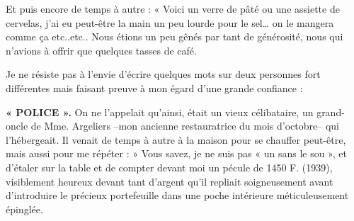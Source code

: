Et puis encore de temps à autre : « Voici un verre de pâté ou une assiette de cervelas,
j’ai eu peut-être la main un peu lourde pour le sel… on le mangera comme ça
etc..etc.. Nous étions un peu gênés par tant de générosité, nous qui n’avions à
offrir que quelques tasses de café.

Je ne résiste pas à l’envie d’écrire quelques mots sur deux personnes fort différentes
mais faisant preuve à mon égard d’une grande confiance :

\textbf{« POLICE ».} On ne l’appelait qu’ainsi, était un vieux célibataire, un grand-oncle de
Mme. Argeliers --mon ancienne restauratrice du mois d’octobre-- qui l’hébergeait. Il
venait de temps à autre à la maison pour se chauffer peut-être, mais aussi pour me
répéter : » Vous savez, je ne suis pas « un sans le sou », et d’étaler sur la table et de
compter devant moi un pécule de 1450 F. (1939), visiblement heureux devant tant
d’argent qu’il repliait soigneusement avant d’introduire le précieux portefeuille dans
une poche intérieure méticuleusement épinglée.
